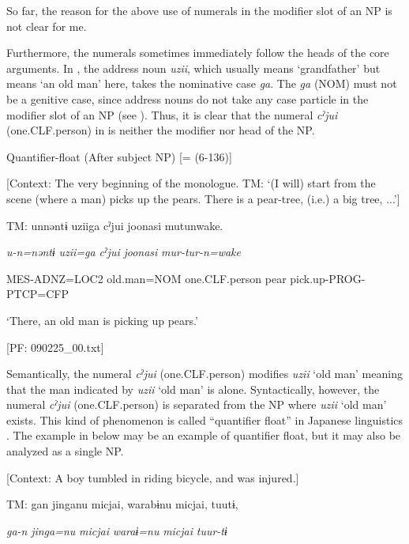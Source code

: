 So far, the reason for the above use of numerals in the modifier slot of an NP is not clear for me.

Furthermore, the numerals sometimes immediately follow the heads of the core arguments. In , the address noun \textit{uzii}, which usually means ‘grandfather’ but means ‘an old man’ here, takes the nominative case \textit{ga}. The \textit{ga} (NOM) must not be a genitive case, since address nouns do not take any case particle in the modifier slot of an NP (see ). Thus, it is clear that the numeral \textit{cˀjui} (one.CLF.person) in  is neither the modifier nor head of the NP.

\ea \label{ex:7:16}  Quantifier-float (After subject NP) [= (6-136)]

  [Context: The very beginning of the monologue. TM: ‘(I will) start from the scene (where a man) picks up the pears. There is a pear-tree, (i.e.) a big tree, ...’]

  TM:  unnəntɨ  uziiga  cˀjui  joonasi   mutunwake.

    \textit{u-n=nəntɨ}  \textit{uzii=ga}  \textit{cˀjui}  \textit{joonasi} \textit{mur-tur-n=wake}
                                                                           
    MES-ADNZ=LOC2  old.man=NOM  one.CLF.person  pear  pick.up-PROG-PTCP=CFP

    ‘There, an old man is picking up pears.’

    [PF: 090225\_00.txt]
\z

Semantically, the numeral \textit{cˀjui} (one.CLF.person) modifies \textit{uzii} ‘old man’ meaning that the man indicated by \textit{uzii} ‘old man’ is alone. Syntactically, however, the numeral \textit{cˀjui} (one.CLF.person) is separated from the NP where \textit{uzii} ‘old man’ exists. This kind of phenomenon is called “quantifier float” in Japanese linguistics \citep[286]{Shibatani1990}. The example in  below may be an example of quantifier float, but it may also be analyzed as a single NP.

\ea \label{ex:7:17}  [Context: A boy tumbled in riding bicycle, and was injured.]

  TM:  gan  jinganu  micjai,  warabɨnu  micjai,  tuutɨ,

    \textit{ga-n}  \textit{jinga=nu}  \textit{micjai}  \textit{waraɨ=nu} \textit{micjai}  \textit{tuur-tɨ}
                                                                         
